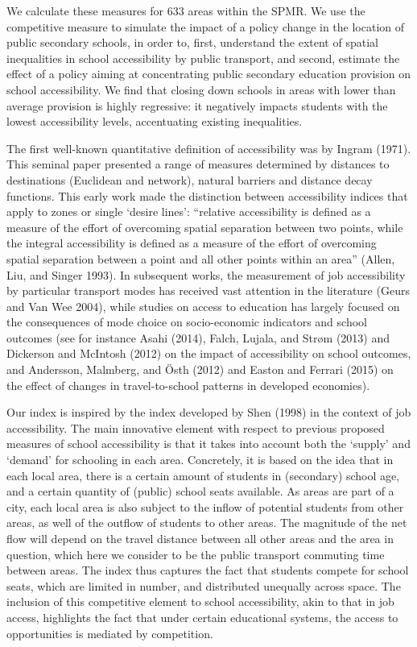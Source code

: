 \documentclass[3p,authoryear,preprint,review,12pt]{elsarticle}
\begin{document}
We calculate these measures for 633 areas within the SPMR. We use the competitive measure to simulate the impact of a policy change in the location of public secondary schools, in order to, first, understand the extent of spatial inequalities in school accessibility by public transport, and second, estimate the
effect of a policy aiming at concentrating public secondary education provision on school accessibility. We find that closing down schools in areas with lower than average provision is highly regressive: it
negatively impacts students with the lowest accessibility levels,
accentuating existing inequalities.

The first well-known quantitative definition of accessibility was by Ingram (1971).
This seminal paper presented a range of measures determined by
distances to destinations (Euclidean and network), natural barriers and 
distance decay functions. This early work made the distinction
between accessibility indices that apply to zones or single `desire
lines': ``relative accessibility is defined as a measure of the effort of overcoming spatial separation between two points, while the integral accessibility is defined as a measure of the effort of overcoming spatial separation between a point and all other points within an area'' (Allen, Liu, and Singer 1993). In subsequent works, the measurement of job accessibility by particular transport modes has received vast attention in the literature (Geurs and Van Wee 2004), while studies on access to education has largely focused on the consequences of mode choice on socio-economic indicators and school outcomes (see for instance Asahi (2014), Falch, Lujala, and Str{ø}m (2013) and Dickerson and McIntosh (2012) on the impact of accessibility on school outcomes, and Andersson, Malmberg, and {Ö}sth (2012) and Easton and Ferrari (2015) on the effect of changes in travel-to-school patterns in developed economies).

Our index is inspired by the index developed by Shen (1998) in the
context of job accessibility. The main innovative element with respect to previous proposed measures of school accessibility is that it takes into account both the `supply' and `demand' for schooling in each area. Concretely, it is based on the idea that in each local area, there is a certain amount of students in (secondary) school age, and a certain quantity of (public) school seats available. As areas are part of a city, each local area is also subject to the inflow of potential students from other areas, as well of the outflow of students to other areas. The magnitude of the net flow will depend on the travel distance between all other areas and the area in question, which here we consider to be the public transport commuting time between areas. The index thus
captures the fact that students compete for school seats, which are
limited in number, and distributed unequally across space. The inclusion of this competitive element to school accessibility, akin to that in job access, highlights the fact that under certain educational systems, the access to opportunities is mediated by competition.
\end{document}

